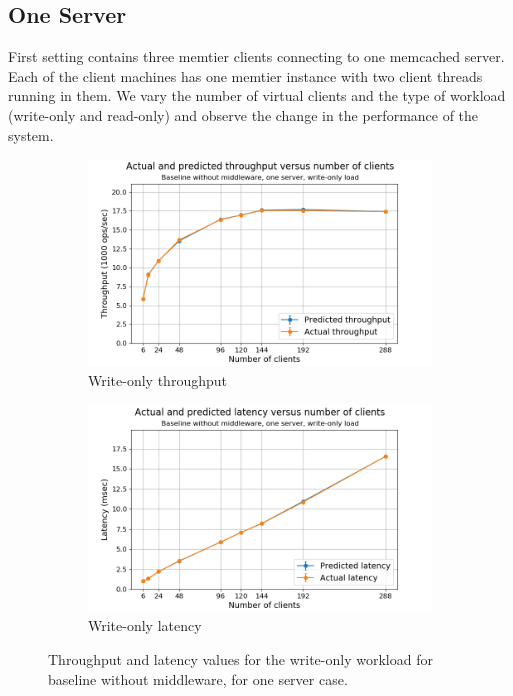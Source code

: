 \documentclass[11pt,a4paper]{article}
\begin{document}
\subsection{One Server} \label{sec:csb1}
First setting contains three memtier clients connecting to one memcached server. Each of the client machines has one memtier instance with two client threads running in them. We vary the number of virtual clients and the type of workload (write-only and read-only) and observe the change in the performance of the system.

\begin{figure}[h]
\centering
\begin{subfigure}{.5\textwidth}
  \centering
  \includegraphics[width=1.0\linewidth,trim={20px 0px 35px 0px},clip]{img/plot/csb1-wo-law_tpt.png}
  \caption{Write-only throughput}
  \label{fig:csb1-wo-law_tpt}
\end{subfigure}%
\begin{subfigure}{.5\textwidth}
  \centering
  \includegraphics[width=1.0\linewidth,trim={20px 0px 40px 0px},clip]{img/plot/csb1-wo-law_lat.png}
  \caption{Write-only latency}
  \label{fig:csb1-wo-law_lat}
\end{subfigure}
\caption{Throughput and latency values for the write-only workload for baseline without middleware, for one server case.}
\label{fig:csb1-wo-law}
\end{figure}
\end{document}

